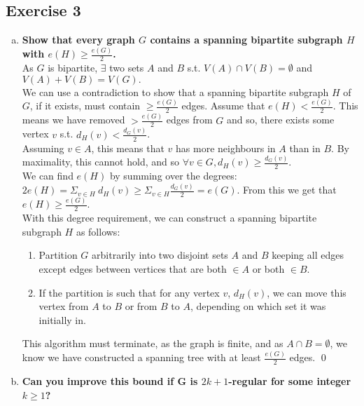 \subsection*{Exercise 3}
\begin{enumerate}[a)]
    \boldmath
    \item \textbf{Show that every graph $G$ contains a spanning bipartite subgraph $H$ with $e(H) \geq \frac{e(G)}{2}$.} \\
    \unboldmath
    \linebreak 
    As $G$ is bipartite, $\exists$ two sets $A$ and $B$ s.t. $V(A) \cap V(B) = \emptyset$ and $V(A) + V(B) = V(G).$ \\
    \linebreak 
    We can use a contradiction to show that a spanning bipartite subgraph $H$ of $G$, if it exists, must contain $\geq \frac{e(G)}{2}$ edges. Assume that $e(H) < \frac{e(G)}{2}$. This means we have removed $> \frac{e(G)}{2}$ edges from $G$ and so, there exists some vertex $v$ s.t. $d_H(v) < \frac{d_G(v)}{2}$. \\
    \linebreak 
    Assuming $v \in A$, this means that $v$ has more neighbours in $A$ than in $B$. By maximality, this cannot hold, and so $\forall v \in G, d_H(v) \geq \frac{d_G(v)}{2}$. \\
    \linebreak 
    We can find $e(H)$ by summing over the degrees: $2e(H) = \Sigma_{v \in H} \: d_H(v) \geq \Sigma_{v \in H} \frac{d_G(v)}{2} = e(G)$. From this we get that $e(H) \geq \frac{e(G)}{2}$. \\
    \linebreak 
    With this degree requirement, we can construct a spanning bipartite subgraph $H$ as follows: 
    \begin{enumerate}
        \item  Partition $G$ arbitrarily into two disjoint sets $A$ and $B$ keeping all edges except edges between vertices that are both $\in A$ or both $\in B$.
        \item If the partition is such that for any vertex $v$, $d_H(v)$, we can move this vertex from $A$ to $B$ or from $B$ to $A$, depending on which set it was initially in. 
    \end{enumerate}
    This algorithm must terminate, as the graph is finite, and as $A \cap B = \emptyset$, we know we have constructed a spanning tree with at least $\frac{e(G)}{2}$ edges.  \qed 
    \item \textbf{Can you improve this bound if G is $2k + 1$-regular for some integer $k \geq 1$?} \\

\end{enumerate}
